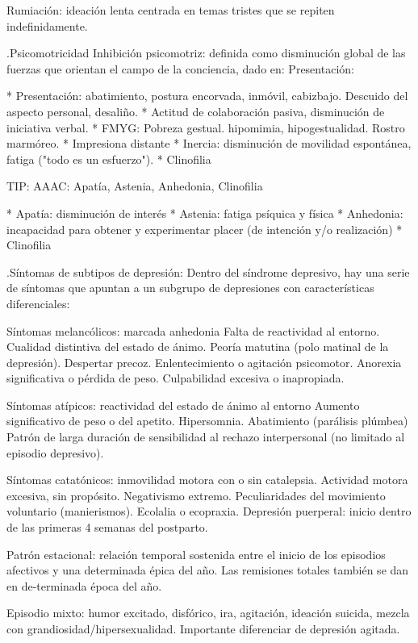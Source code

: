 \documentclass[encares.tex]{subfiles}
\begin{document}
Rumiación: ideación lenta centrada en temas tristes que se repiten indefinidamente.

.Psicomotricidad
Inhibición psicomotriz: definida como disminución global de las fuerzas que orientan el campo de la conciencia, dado en: Presentación:

* Presentación: abatimiento, postura encorvada, inmóvil, cabizbajo. Descuido del aspecto personal, desaliño.
* Actitud de colaboración pasiva, disminución de iniciativa verbal.
* FMYG: Pobreza gestual. hipomimia, hipogestualidad. Rostro marmóreo.
* Impresiona distante
* Inercia: disminución de movilidad espontánea, fatiga ("todo es un esfuerzo").
* Clinofilia

TIP: AAAC: Apatía, Astenia, Anhedonia, Clinofilia

* Apatía: disminución de interés
* Astenia: fatiga psíquica y física
* Anhedonia: incapacidad para obtener y experimentar placer (de intención y/o realización)
* Clinofilia

.Síntomas de subtipos de depresión:
Dentro del síndrome depresivo, hay una serie de síntomas que apuntan a un subgrupo de depresiones con características diferenciales:

Síntomas melancólicos: marcada anhedonia Falta de reactividad al entorno. Cualidad distintiva del estado de ánimo. Peoría matutina (polo matinal de la depresión). Despertar precoz. Enlentecimiento o agitación psicomotor. Anorexia significativa o pérdida de peso. Culpabilidad excesiva o inapropiada.

Síntomas atípicos: reactividad del estado de ánimo al entorno Aumento significativo de peso o del apetito. Hipersomnia. Abatimiento (parálisis plúmbea) Patrón de larga duración de sensibilidad al rechazo interpersonal (no limitado al episodio depresivo).

Síntomas catatónicos: inmovilidad motora con o sin catalepsia. Actividad motora excesiva, sin propósito. Negativismo extremo. Peculiaridades del movimiento voluntario (manierismos). Ecolalia o ecopraxia. Depresión puerperal: inicio dentro de las primeras 4 semanas del postparto.

Patrón estacional: relación temporal sostenida entre el inicio de los episodios afectivos y una determinada épica del año. Las remisiones totales también se dan en de-terminada época del año.

Episodio mixto: humor excitado, disfórico, ira, agitación, ideación suicida, mezcla con grandiosidad/hipersexualidad. Importante diferenciar de depresión agitada.
\end{document}
